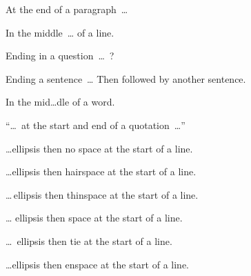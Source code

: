 

At the end of a paragraph~…

In the middle~… of a line.

Ending in a question~…~?

Ending a sentence~…
Then followed by another sentence.

In the mid…dle of a word.

“…~at the start and end of a quotation~…”

…ellipsis then no space at the start of a line.

…\hairspace ellipsis then hairspace at the start of a line.

…\,ellipsis then thinspace at the start of a line.

… ellipsis then space at the start of a line.

…~ellipsis then tie at the start of a line.

…\enspace ellipsis then enspace at the start of a line.

\endbook
